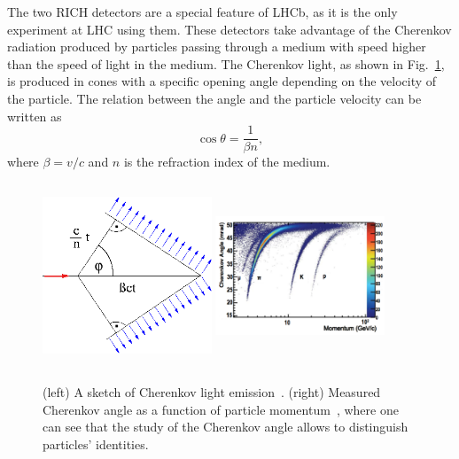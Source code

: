 The two RICH detectors are a special feature of LHCb, as it is the only experiment at LHC using them. 
These detectors take advantage of the Cherenkov radiation produced by particles passing through a medium
with speed higher than the speed of light in the medium. The Cherenkov light, as shown in Fig.~\ref{Cherenkov}, 
is produced in cones with a specific opening angle depending on the velocity of the particle. The relation
between the angle and the particle velocity can be written as 
%
\begin{equation}
\cos\theta = \frac{1}{\beta n},
\end{equation}
%
where $\beta = v/c$ and $n$ is the refraction index of the medium.
%
\begin{figure}[h!]
\centering
\includegraphics[width=0.45\textwidth,height=5.5cm]{Detector/figs/detector/Cherenkov.png}
\includegraphics[width=0.45\textwidth,height=5.5cm]{Detector/figs/changle_vs_momentum.png}
\caption{(left) A sketch of Cherenkov light emission~\cite{Cherenkov_sheme}.
 (right) Measured Cherenkov angle as a function of particle momentum~\cite{Alves:2008zz}, where one
  can see that the study of the Cherenkov angle allows to distinguish particles' identities. }
\label{Cherenkov}
\end{figure}

